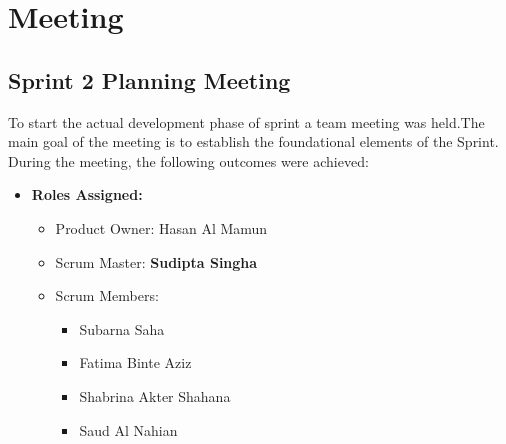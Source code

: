\documentclass[a4paper,12pt]{article}
\begin{document}
\section{Meeting}
\subsection{Sprint 2 Planning Meeting}
To start the actual development phase of sprint
a team meeting was held.The main goal of the meeting is to establish the foundational elements of the Sprint. During the meeting, the following outcomes were achieved:
\begin{itemize}
    \item \textbf{Roles Assigned:}
        \begin{itemize}
            \item Product Owner: Hasan Al Mamun
            \item Scrum Master: \textbf{Sudipta Singha}
            \item Scrum Members:
                \begin{itemize}
                    \item Subarna Saha
                    \item Fatima Binte Aziz
                    \item Shabrina Akter Shahana
                    \item Saud Al Nahian

                \end{itemize}
        \end{itemize}


\end{itemize}
\end{document}
